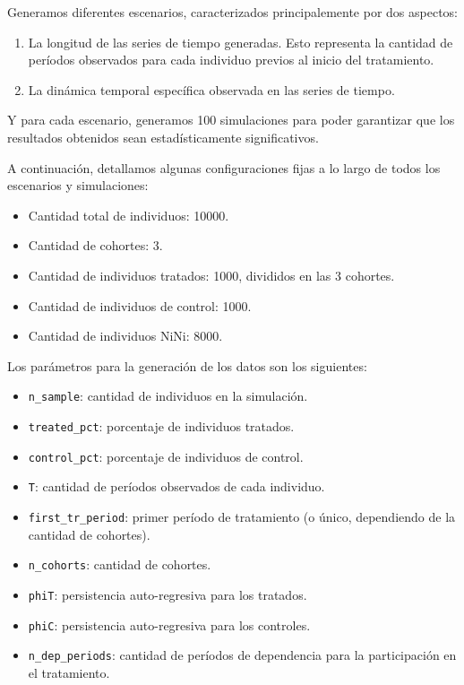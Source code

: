 \documentclass[../../main.tex]{subfiles}
\begin{document}
Generamos diferentes escenarios, caracterizados principalemente por dos aspectos:
\begin{enumerate}[itemsep=0.01cm, label=\textbf{\arabic*.}]
    \item La longitud de las series de tiempo generadas. Esto representa la cantidad
    de períodos observados para cada individuo previos al inicio del tratamiento.
    \item La dinámica temporal específica observada en las series de tiempo.
\end{enumerate}
Y para cada escenario, generamos 100 simulaciones para poder garantizar que los resultados
obtenidos sean estadísticamente significativos.

A continuación, detallamos algunas configuraciones fijas a lo largo de todos los
escenarios y simulaciones:
\begin{itemize}[noitemsep]
    \item Cantidad total de individuos: 10000.
    \item Cantidad de cohortes: 3.
    \item Cantidad de individuos tratados: 1000, divididos en las 3 cohortes.
    \item Cantidad de individuos de control: 1000.
    \item Cantidad de individuos NiNi: 8000.
\end{itemize}

Los parámetros para la generación de los datos son los siguientes:
\begin{itemize}[itemsep=0.1cm]
    \item \texttt{n\_sample}: cantidad de individuos en la simulación.
    \item \texttt{treated\_pct}: porcentaje de individuos tratados.
    \item \texttt{control\_pct}: porcentaje de individuos de control.
    \item \texttt{T}: cantidad de períodos observados de cada individuo.
    \item \texttt{first\_tr\_period}: primer período de tratamiento (o único, dependiendo
    de la cantidad de cohortes).
    \item \texttt{n\_cohorts}: cantidad de cohortes.
    \item \texttt{phiT}: persistencia auto-regresiva para los tratados.
    \item \texttt{phiC}: persistencia auto-regresiva para los controles.
    \item \texttt{n\_dep\_periods}: cantidad de períodos de dependencia para la
    participación en el tratamiento.
\end{itemize}
\end{document}
